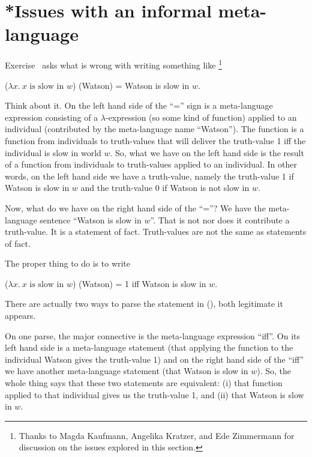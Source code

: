 \section{*Issues with an informal meta-language}\label{sec:meta-issues}

Exercise~ %
%
asks what is wrong with writing something like%
\footnote{Thanks to Magda Kaufmann, Angelika Kratzer, and Ede
  Zimmermann for discussion on the issues explored in this section.}%

\ex ($\lambda x.\ x \mbox{ is slow in } w$) (Watson) = Watson is slow
in $w$.\label{ex:badwatson} \xe

Think about it. On the left hand side of the ``='' sign is a meta-language
expression consisting of a $\lambda$-expression (so some kind of function)
applied to an individual (contributed by the meta-language name ``Watson''). The
function is a function from individuals to truth-values that will deliver the
truth-value 1 iff the individual is slow in world $w$. So, what we have on the
left hand side is the result of a function from individuals to truth-values
applied to an individual. In other words, on the left hand side we have a
truth-value, namely the truth-value 1 if Watson is slow in $w$ and the
truth-value 0 if Watson is not slow in $w$.

Now, what do we have on the right hand side of the ``=''? We have the
meta-language sentence ``Watson is slow in $w$''. That is not nor does it
contribute a truth-value. It is a statement of fact. Truth-values are not the
same as statements of fact.

The proper thing to do is to write

\ex ($\lambda x.\ x \mbox{ is slow in } w$) (Watson) = 1 iff Watson
is slow in $w$.\label{ex:goodwatson} \xe

There are actually two ways to parse the statement in (\lastx), both legitimate it
appears.

On one parse, the major connective is the meta-language expression ``iff''. On
its left hand side is a meta-language statement (that applying the function to
the individual Watson gives the truth-value 1) and on the right hand side of the
``iff'' we have another meta-language statement (that Watson is slow in $w$).
So, the whole thing says that these two statements are equivalent: (i) that
function applied to that individual gives us the truth-value 1, and (ii) that
Watson is slow in $w$.

